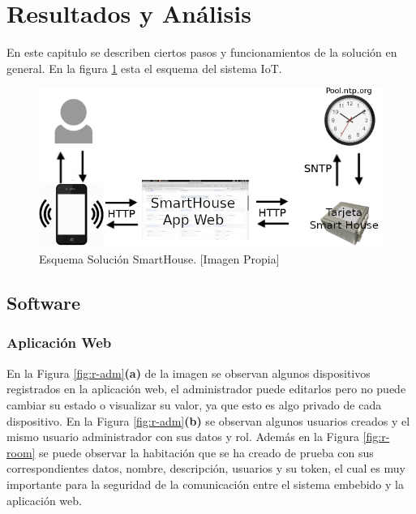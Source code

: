 \section{Resultados y Análisis}

En este capitulo se describen ciertos pasos y funcionamientos de la solución en general. En la figura \ref{fig:iot} esta el esquema del sistema IoT.\\

\begin{figure}[!t]
	\centering
	\caption[Esquema Solución SmartHouse.]{Esquema Solución SmartHouse. [Imagen Propia]}
	\label{fig:iot}
	\includegraphics[width=0.5\linewidth]{Imagenes/IOT}
\end{figure}

\subsection{Software}

\subsubsection{Aplicación Web}

En la Figura \ref{fig:r-adm}\textbf{(a)} de la imagen se observan algunos dispositivos registrados en la aplicación web, el administrador puede editarlos pero no puede cambiar su estado o visualizar su valor, ya que esto es algo privado de cada dispositivo. En la Figura \ref{fig:r-adm}\textbf{(b)} se observan algunos usuarios creados y el mismo usuario administrador con sus datos y rol. Además en la Figura \ref{fig:r-room} se puede observar la habitación que se ha creado de prueba con sus correspondientes datos, nombre, descripción, usuarios y su token, el cual es muy importante para la seguridad de la comunicación entre el sistema embebido y la aplicación web.\\

